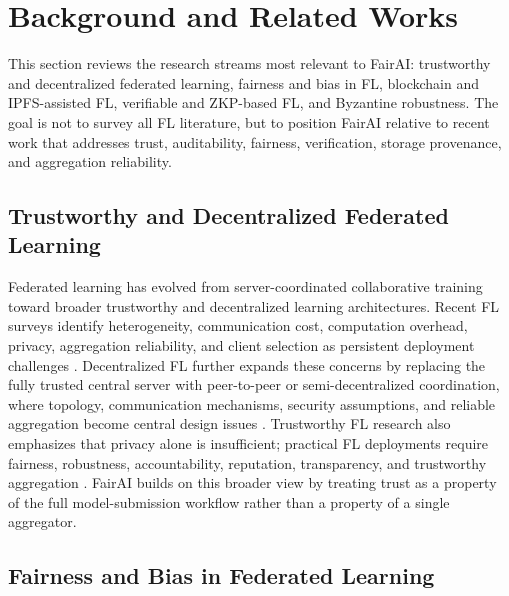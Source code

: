 \documentclass[futureinternet,article,submit,pdftex,moreauthors]{Definitions/mdpi}
\begin{document}
\section{Background and Related Works}
\label{sec:background-related-works}

This section reviews the research streams most relevant to FairAI: trustworthy and decentralized federated learning, fairness and bias in FL, blockchain and IPFS-assisted FL, verifiable and ZKP-based FL, and Byzantine robustness. The goal is not to survey all FL literature, but to position FairAI relative to recent work that addresses trust, auditability, fairness, verification, storage provenance, and aggregation reliability.

\subsection{Trustworthy and Decentralized Federated Learning}
\label{subsec:rw-trustworthy-dfl}

Federated learning has evolved from server-coordinated collaborative training toward broader trustworthy and decentralized learning architectures. Recent FL surveys identify heterogeneity, communication cost, computation overhead, privacy, aggregation reliability, and client selection as persistent deployment challenges \cite{intro_1}. Decentralized FL further expands these concerns by replacing the fully trusted central server with peer-to-peer or semi-decentralized coordination, where topology, communication mechanisms, security assumptions, and reliable aggregation become central design issues \cite{intro_2}. Trustworthy FL research also emphasizes that privacy alone is insufficient; practical FL deployments require fairness, robustness, accountability, reputation, transparency, and trustworthy aggregation \cite{intro_3}. FairAI builds on this broader view by treating trust as a property of the full model-submission workflow rather than a property of a single aggregator.

\subsection{Fairness and Bias in Federated Learning}
\label{subsec:rw-fairness-bias}
\end{document}
